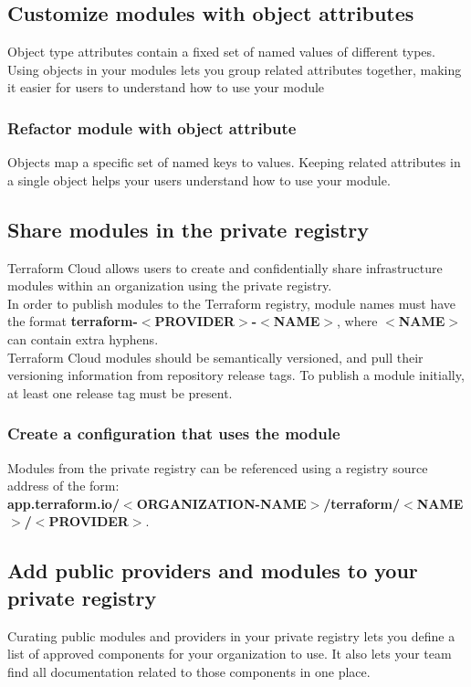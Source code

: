 \documentclass[12pt, letterpaper, twoside]{article}
\begin{document}
\subsection{Customize modules with object attributes}
Object type attributes contain a fixed set of named values of different types. 
Using objects in your modules lets you group related attributes together, making 
it easier for users to understand how to use your module

\subsubsection{Refactor module with object attribute}
Objects map a specific set of named keys to values. Keeping related attributes 
in a single object helps your users understand how to use your module.

\subsection{Share modules in the private registry}
Terraform Cloud allows users to create and confidentially share infrastructure modules 
within an organization using the private registry.\\

In order to publish modules to the Terraform registry, module names must have 
the format \textbf{terraform-$<$PROVIDER$>$-$<$NAME$>$}, where \textbf{$<$NAME$>$} can contain 
extra hyphens.\\

Terraform Cloud modules should be semantically versioned, and pull their versioning 
information from repository release tags. To publish a module initially, at least 
one release tag must be present.\\

\subsubsection{Create a configuration that uses the module}
Modules from the private registry can be referenced using a registry source address 
of the form:\\
\textbf{app.terraform.io/$<$ORGANIZATION-NAME$>$/terraform/$<$NAME$>$/$<$PROVIDER$>$}.

\subsection{Add public providers and modules to your private registry}
Curating public modules and providers in your private registry lets you define a 
list of approved components for your organization to use. It also lets your team 
find all documentation related to those components in one place.\\
\end{document}

